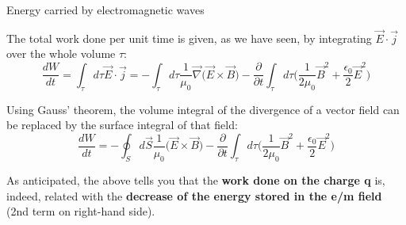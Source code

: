 \begin{frame}{Energy carried by electromagnetic waves}

The total work done per unit time is given, as we have seen, by integrating
$\vec{E} \cdot \vec{j}$ over the whole volume $\tau$:
\begin{equation*}
  \frac{dW}{dt} =  \int_{\tau} d\tau \vec{E} \cdot \vec{j} =
     - \int_{\tau} d\tau \frac{1}{\mu_0} \vec{\nabla} \Big( \vec{E} \times \vec{B} \Big)
     - \frac{\partial}{\partial t} \int_{\tau} d\tau  \Big( \frac{1}{2\mu_0} \vec{B}^2 + \frac{\epsilon_0}{2} \vec{E}^2 \Big)
\end{equation*}

\vspace{0.2cm}

Using Gauss' theorem, the volume integral of the divergence of a vector field can be replaced by the
surface integral of that field:
\begin{equation*}
  \frac{dW}{dt} =
     - \oint_{S} d\vec{S} \frac{1}{\mu_0} \Big( \vec{E} \times \vec{B} \Big)
     - \frac{\partial}{\partial t} \int_{\tau} d\tau  \Big( \frac{1}{2\mu_0} \vec{B}^2 + \frac{\epsilon_0}{2} \vec{E}^2 \Big)
\end{equation*}

As anticipated, the above tells you that the {\bf work done on the charge q} is, indeed, related with the
{\bf decrease of the energy stored in the e/m field} (2nd term on right-hand side).

\end{frame}


%
%
%
%


